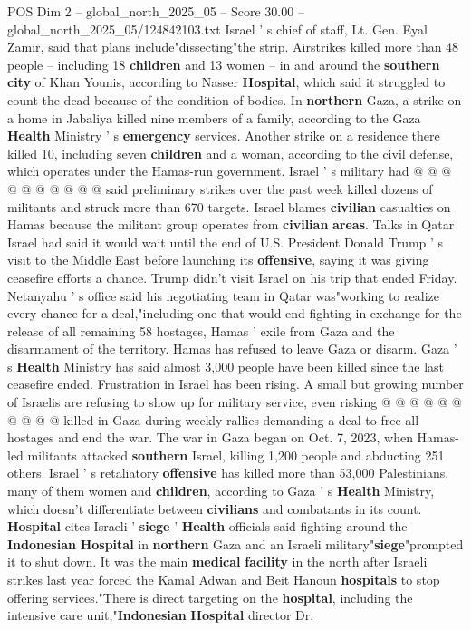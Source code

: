 \begin{textsample}{POS Dim 2 – global\_north\_2025\_05 – Score 30.00 – global\_north\_2025\_05/124842103.txt}
Israel ' s chief of staff, Lt.
Gen.
Eyal Zamir, said that plans include"dissecting"the strip.
Airstrikes killed more than 48 people -- including 18 \textbf{children} and 13 women -- in and around the \textbf{southern} \textbf{city} of Khan Younis, according to Nasser \textbf{Hospital}, which said it struggled to count the dead because of the condition of bodies.
In \textbf{northern} Gaza, a strike on a home in Jabaliya killed nine members of a family, according to the Gaza \textbf{Health} Ministry ' s \textbf{emergency} services.
Another strike on a residence there killed 10, including seven \textbf{children} and a woman, according to the civil defense, which operates under the Hamas-run government.
Israel ' s military had @ @ @ @ @ @ @ @ @ @ said preliminary strikes over the past week killed dozens of militants and struck more than 670 targets.
Israel blames \textbf{civilian} casualties on Hamas because the militant group operates from \textbf{civilian} \textbf{areas}.
Talks in Qatar Israel had said it would wait until the end of U.S.
President Donald Trump ' s visit to the Middle East before launching its \textbf{offensive}, saying it was giving ceasefire efforts a chance.
Trump didn't visit Israel on his trip that ended Friday.
Netanyahu ' s office said his negotiating team in Qatar was"working to realize every chance for a deal,"including one that would end fighting in exchange for the release of all remaining 58 hostages, Hamas ' exile from Gaza and the disarmament of the territory.
Hamas has refused to leave Gaza or disarm.
Gaza ' s \textbf{Health} Ministry has said almost 3,000 people have been killed since the last ceasefire ended.
Frustration in Israel has been rising.
A small but growing number of Israelis are refusing to show up for military service, even risking @ @ @ @ @ @ @ @ @ @ killed in Gaza during weekly rallies demanding a deal to free all hostages and end the war.
The war in Gaza began on Oct. 7, 2023, when Hamas-led militants attacked \textbf{southern} Israel, killing 1,200 people and abducting 251 others.
Israel ' s retaliatory \textbf{offensive} has killed more than 53,000 Palestinians, many of them women and \textbf{children}, according to Gaza ' s \textbf{Health} Ministry, which doesn't differentiate between \textbf{civilians} and combatants in its count. \textbf{Hospital} cites Israeli ' \textbf{siege} ' \textbf{Health} officials said fighting around the \textbf{Indonesian} \textbf{Hospital} in \textbf{northern} Gaza and an Israeli military"\textbf{siege}"prompted it to shut down.
It was the main \textbf{medical} \textbf{facility} in the north after Israeli strikes last year forced the Kamal Adwan and Beit Hanoun \textbf{hospitals} to stop offering services."There is direct targeting on the \textbf{hospital}, including the intensive care unit,"\textbf{Indonesian} \textbf{Hospital} director Dr.

\end{textsample}
